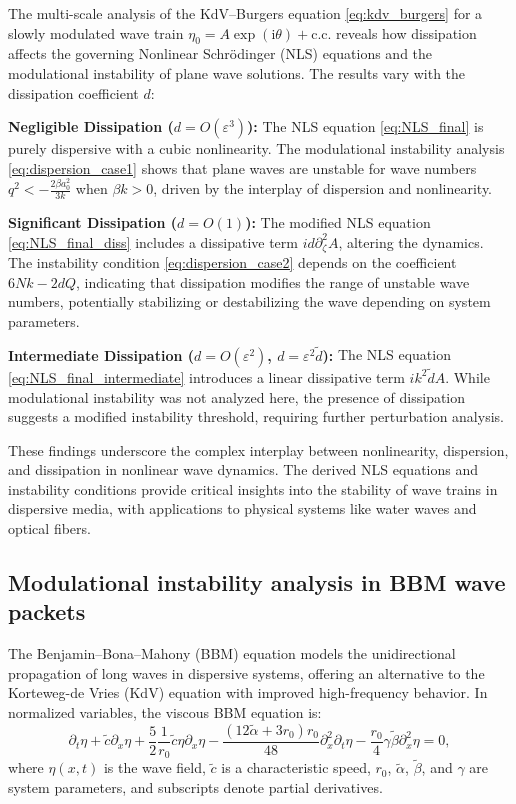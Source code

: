 \documentclass[alpha-refs, 12pt]{wiley-article}
\newcommand{\ui}{\mathrm{i}}
\newcommand{\eps}{\varepsilon}
\begin{document}
The multi-scale analysis of the KdV--Burgers equation \eqref{eq:kdv_burgers} for a slowly modulated wave train $\eta_0 = A \exp(\ui \theta) + \text{c.c.}$ reveals how dissipation affects the governing Nonlinear Schr\"odinger (NLS) equations and the modulational instability of plane wave solutions. The results vary with the dissipation coefficient $d$:

\begin{description}
  \item{\textbf{Negligible Dissipation ($d = O(\eps^3)$):}} The NLS equation \eqref{eq:NLS_final} is purely dispersive with a cubic nonlinearity. The modulational instability analysis \eqref{eq:dispersion_case1} shows that plane waves are unstable for wave numbers $q^2 < -\frac{2 \beta a_0^2}{3 k}$ when $\beta k > 0$, driven by the interplay of dispersion and nonlinearity.
  \item{\textbf{Significant Dissipation ($d = O(1)$):}} The modified NLS equation \eqref{eq:NLS_final_diss} includes a dissipative term $i d \partial_\zeta^2 A$, altering the dynamics. The instability condition \eqref{eq:dispersion_case2} depends on the coefficient $6 N k - 2 d Q$, indicating that dissipation modifies the range of unstable wave numbers, potentially stabilizing or destabilizing the wave depending on system parameters.
  \item{\textbf{Intermediate Dissipation ($d = O(\eps^2)$, $d = \eps^2 \tilde{d}$):}} The NLS equation \eqref{eq:NLS_final_intermediate} introduces a linear dissipative term $i k^2 \tilde{d} A$. While modulational instability was not analyzed here, the presence of dissipation suggests a modified instability threshold, requiring further perturbation analysis.
\end{description}
These findings underscore the complex interplay between nonlinearity, dispersion, and dissipation in nonlinear wave dynamics. The derived NLS equations and instability conditions provide critical insights into the stability of wave trains in dispersive media, with applications to physical systems like water waves and optical fibers.

\subsection{Modulational instability analysis in BBM wave packets}

The Benjamin--Bona--Mahony (BBM) equation models the unidirectional propagation of long waves in dispersive systems, offering an alternative to the Korteweg-de Vries (KdV) equation with improved high-frequency behavior. In normalized variables, the viscous BBM equation is:
\begin{equation}\label{eq:BBM1}
  \partial_t \eta + \tilde{c} \partial_x \eta + \frac{5}{2} \frac{1}{r_0} \tilde{c} \eta \partial_x \eta - \frac{(12 \tilde{\alpha} + 3 r_0) r_0}{48} \partial_x^2 \partial_t \eta - \frac{r_0}{4} \gamma \tilde{\beta} \partial_x^2 \eta = 0,
\end{equation}
where $\eta(x,t)$ is the wave field, $\tilde{c}$ is a characteristic speed, $r_0$, $\tilde{\alpha}$, $\tilde{\beta}$, and $\gamma$ are system parameters, and subscripts denote partial derivatives.
\end{document}
